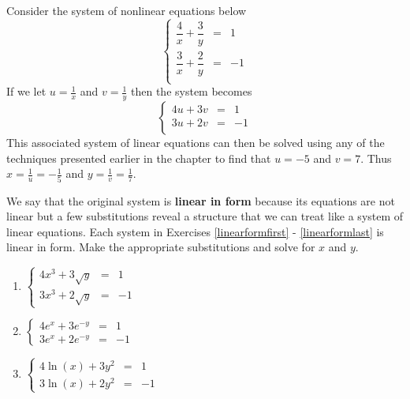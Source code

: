 \documentclass{ximera}
\begin{document}
Consider the system of nonlinear equations  below \[\left\{\begin{array}{rcr}  \dfrac{4}{x} + \dfrac{3}{y} & = & 1 \\[10pt] \dfrac{3}{x} + \dfrac{2}{y} & = & -1 \\ \end{array} \right.\]  If we let $u = \frac{1}{x}$ and $v = \frac{1}{y}$ then the system becomes \[\left\{\begin{array}{rcr}  4u + 3v & = & 1 \\ 3u + 2v & = & -1 \\ \end{array} \right.\] This associated system of linear equations can then be solved using any of the techniques presented earlier in the chapter to find that $u = -5$ and $v = 7$.  Thus $x = \frac{1}{u} = -\frac{1}{5}$ and $y = \frac{1}{v} = \frac{1}{7}$.  

\smallskip

We say that the original system is {\bf linear in form}  because its equations are not linear but a few substitutions reveal a structure that we can treat like a system of linear equations.  Each system in Exercises \ref{linearformfirst} - \ref{linearformlast}  is linear in form.  Make the appropriate substitutions and solve for $x$ and $y$.

\begin{multicols}{3}
\begin{enumerate}
\setcounter{enumi}{\value{HW}}

\item $\left\{\begin{array}{rcr}  4x^{3} + 3\sqrt{y} & = & 1 \\ 3x^{3} + 2\sqrt{y} & = & -1  \end{array} \right.$ \label{linearformfirst}
\item $\left\{\begin{array}{rcr}  4e^{x} + 3e^{-y} & = & 1 \\ 3e^{x} + 2e^{-y} & = & -1  \end{array} \right.$
\item $\left\{\begin{array}{rcr}  4\ln(x) + 3y^{2} & = & 1 \\ 3\ln(x) + 2y^{2} & = & -1 \end{array} \right.$ \label{linearformlast}

\setcounter{HW}{\value{enumi}}
\end{enumerate}
\end{multicols}
\end{document}
